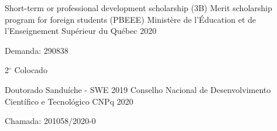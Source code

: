 

\begin{cventries}

\cventry
	{Short-term or professional development scholarship (3B)} %
	{Merit scholarship program for foreign students (PBEEE)} %
	{Ministère de l'Éducation et de l'Enseignement Supérieur du Québec} %
	{2020} %
	{
		\begin{cvitems} %
			\item {Demanda: 290838}
			\item {2$^{\circ}$ Colocado}
		\end{cvitems}		
	}

	\cventry
	{Doutorado Sanduíche - SWE 2019} %
	{Conselho Nacional de Desenvolvimento Científico e Tecnológico} %
	{CNPq} %
	{2020} %
	{
    \begin{cvitems} %
      \item {Chamada: 201058/2020-0}
    \end{cvitems}
	}
\end{cventries}
